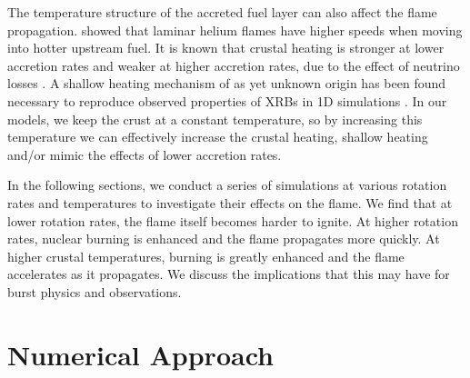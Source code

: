 \documentclass[preprint,times,tighten]{aastex63}
\begin{document}
The temperature structure of the accreted fuel layer can also affect
the flame propagation.  \citet{Timmes00} showed that laminar helium flames 
have higher speeds when moving into hotter upstream fuel.
It is known that crustal heating is stronger at lower
accretion rates and weaker at higher accretion rates, due to the
effect of neutrino losses \citep{Cumming2006,johnston:2019}. 
A shallow heating
mechanism of as yet unknown origin has been found necessary to
reproduce observed properties of XRBs in 1D simulations
\citep{Deibel2015,Turlione2015,Keek2017}.
In our
models, we keep the crust at a constant temperature, so by increasing
this temperature we can effectively increase the crustal heating, shallow heating
and/or
mimic the effects of lower accretion rates. 

In the following sections, we conduct a series of simulations at various rotation 
rates and temperatures to investigate their effects on the flame. We find that 
at lower rotation rates, the flame itself becomes harder to ignite. At higher 
rotation rates, nuclear burning is enhanced and the flame propagates more quickly. 
At higher crustal temperatures, burning is greatly enhanced and the flame accelerates as 
it propagates. We discuss the implications that this may have for burst physics 
and observations. 


\section{Numerical Approach}\label{Sec:numerics}
\end{document}

